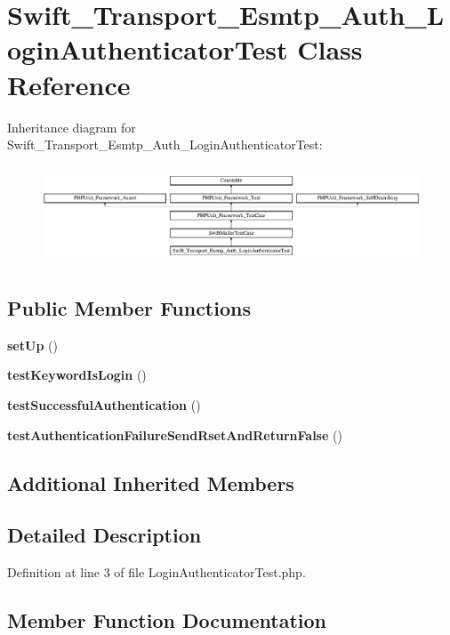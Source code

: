 \section{Swift\+\_\+\+Transport\+\_\+\+Esmtp\+\_\+\+Auth\+\_\+\+Login\+Authenticator\+Test Class Reference}
\label{class_swift___transport___esmtp___auth___login_authenticator_test}
Inheritance diagram for Swift\+\_\+\+Transport\+\_\+\+Esmtp\+\_\+\+Auth\+\_\+\+Login\+Authenticator\+Test\+:\begin{figure}[H]
\begin{center}
\leavevmode
\includegraphics[height=2.944269cm]{class_swift___transport___esmtp___auth___login_authenticator_test}
\end{center}
\end{figure}
\subsection*{Public Member Functions}
\begin{DoxyCompactItemize}
\item 
{\bf set\+Up} ()
\item 
{\bf test\+Keyword\+Is\+Login} ()
\item 
{\bf test\+Successful\+Authentication} ()
\item 
{\bf test\+Authentication\+Failure\+Send\+Rset\+And\+Return\+False} ()
\end{DoxyCompactItemize}
\subsection*{Additional Inherited Members}


\subsection{Detailed Description}


Definition at line 3 of file Login\+Authenticator\+Test.\+php.



\subsection{Member Function Documentation}

